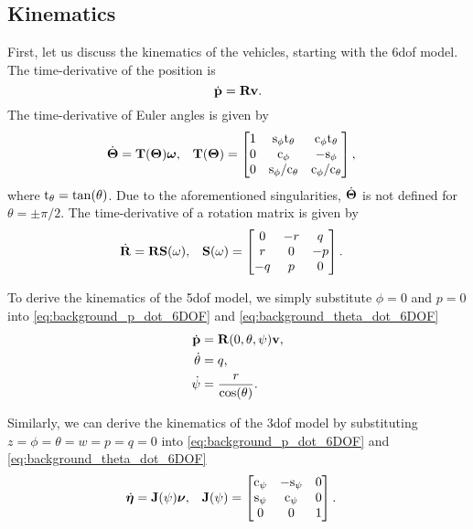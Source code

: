 \subsection{Kinematics}
First, let us discuss the kinematics of the vehicles, starting with the 6\gls{dof} model.
The time-derivative of the position is
\begin{equation}
    \dot{\mathbf{p}} = \mathbf{R} \mathbf{v}.
    \label{eq:background_p_dot_6DOF}
\end{equation}
The time-derivative of Euler angles is given by \cite{fossen_handbook_2011}
\begin{align}
    \dot{\bm{\Theta}} &= \mathbf{T}(\bm{\Theta}) \bm{\omega}, &
    \mathbf{T}(\bm{\Theta}) &= 
    \begin{bmatrix}
        1 & {\rm s}_{\phi}{\rm t}_{\theta} & {\rm c}_{\phi}{\rm t}_{\theta} \\ 0 & {\rm c}_{\phi} & -{\rm s}_{\phi} \\ 0 & {\rm s}_{\phi}/{\rm c}_{\theta} & {\rm c}_{\phi}/{\rm c}_{\theta}
    \end{bmatrix},
    \label{eq:background_theta_dot_6DOF}
\end{align}
where ${\rm t}_{\theta} = \tan(\theta)$.
Due to the aforementioned singularities, $\dot{\bm{\Theta}}$ is not defined for $\theta = \pm \pi/2$.
The time-derivative of a rotation matrix is given by
\begin{align}
    \dot{\mathbf{R}} &= \mathbf{R} \mathbf{S}(\omega), &
    \mathbf{S}(\omega) &=
    \begin{bmatrix}
        0 & -r & q\\ r & 0 & -p\\ -q & p & 0
    \end{bmatrix}.
\end{align}

To derive the kinematics of the 5\gls{dof} model, we simply substitute $\phi = 0$ and $p = 0$ into \eqref{eq:background_p_dot_6DOF} and \eqref{eq:background_theta_dot_6DOF}
\begin{subequations}
    \begin{align}
        \dot{\mathbf{p}} &= \mathbf{R}(0, \theta, \psi) \mathbf{v}, \\
        \dot{\theta} &= q, \\
        \dot{\psi} &= \frac{r}{\cos(\theta)}.
    \end{align}
\end{subequations}

Similarly, we can derive the kinematics of the 3\gls{dof} model by substituting $z = \phi = \theta = w = p = q = 0$ into \eqref{eq:background_p_dot_6DOF} and \eqref{eq:background_theta_dot_6DOF}
\begin{align}
    \dot{\bm{\eta}} &= \mathbf{J}(\psi) \bm{\nu}, &
    \mathbf{J}(\psi) &=
    \begin{bmatrix}
        {\rm c}_{\psi} & -{\rm s}_{\psi} & 0 \\
        {\rm s}_{\psi} & {\rm c}_{\psi} & 0 \\
        0 & 0 & 1
    \end{bmatrix}.
\end{align}

